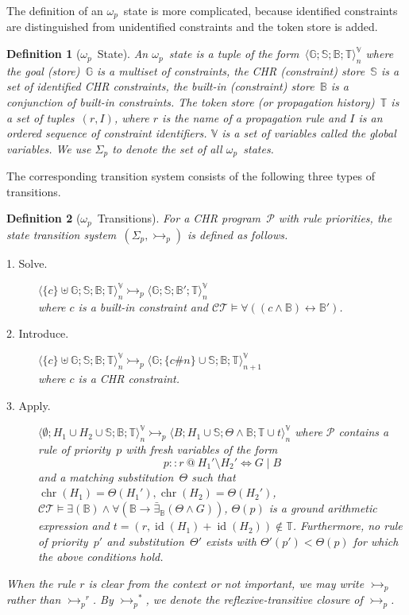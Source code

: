 \documentclass{tlp}
\newtheorem{definition}{Definition}[section]
\newcommand{\B}{\ensuremath{\mathbb{B}}}
\newcommand{\G}{\ensuremath{\mathbb{G}}}
\newcommand{\mcP}{\ensuremath{\mathcal{P}}}
\renewcommand{\S}{\ensuremath{\mathbb{S}}}
\newcommand{\T}{\ensuremath{\mathbb{T}}}
\newcommand{\V}{\ensuremath{\mathbb{V}}}
\newcommand{\CT}{\ensuremath{\mathcal{CT}}}
\DeclareMathOperator{\chr}{chr}
\DeclareMathOperator{\id}{id}
\def\tuple#1{\langle #1 \rangle}
\newcommand{\tstate}[6]{\ensuremath{\tuple{#1; #2; #3; #4}_{#5}^{#6}}}
\newcommand{\pstate}[6]{\ensuremath{\tuple{#1; #2; #3; #4}_{#5}^{#6}}}
\newcommand{\der}{\ensuremath{\rightarrowtail}}
\newcommand{\derp}{\ensuremath{\der_p}}
\begin{document}
The definition of an $\omega_p$~state is more complicated, because
identified constraints are distinguished from unidentified constraints and the
token store is added.

\begin{definition}[$\omega_p$~State] An {\em $\omega_p$~state} is a tuple of the
form~$\pstate{\G}{\S}{\B}{\T}{n}{\V}$ where the {\em goal (store)}~$\G$ is a
multiset of constraints, the {\em CHR (constraint) store}~$\S$ is a set of
identified CHR constraints, the {\em built-in (constraint) store}~$\B$ is a
conjunction of built-in constraints. The {\em token store} (or {\em propagation
history})~$\T$ is a set of tuples~$(r,I)$, where $r$ is the name of a propagation
rule and $I$ is an ordered sequence of constraint identifiers. $\V$ is a set of
variables called the \emph{global variables}. We use $\Sigma_p$ to denote the
set of all $\omega_p$~states.
\end{definition}

The corresponding transition system consists of the following three types of
transitions.

\begin{definition}[$\omega_p$~Transitions]
\label{def:omega-p-transitions}
For a CHR program~$\mcP$ with rule priorities, the state transition
system~$(\Sigma_p,\derp)$ is defined as follows.

\begin{description}
  \item[1. Solve.] $\tstate{\{c\} \uplus \G}{\S}{\B}{\T}{n}{\V} \derp
  \tstate{\G}{\S}{\B'}{\T}{n}{\V}$\\
  where $c$ is a built-in constraint and $\CT \models \forall((c \land \B)
  \leftrightarrow \B')$.
  \item[2. Introduce.] $\tstate{\{c\} \uplus \G}{\S}{\B}{\T}{n}{\V} \derp
  \tstate{\G}{\{c\#n\} \cup \S}{\B}{\T}{n+1}{\V}$\\
  where $c$ is a CHR constraint.
  \item[3. Apply.] $\tstate{\emptyset}{H_1 \cup H_2 \cup \S}{\B}{\T}{n}{\V}
  \derp \tstate{B}{H_1 \cup \S}{\Theta \land \B}{\T \cup t}{n}{\V}$ where $\mcP$
  contains a rule of priority~$p$ with fresh variables of the form \[p :: r\ @\
  H_1' \setminus H_2' \Leftrightarrow G \mid B\] and a matching
  substitution~$\Theta$ such that $\chr(H_1) = \Theta(H_1'), \chr(H_2) =
  \Theta(H_2')$, $\CT \models \exists (\B) \land \forall (\B \rightarrow
  \bar{\exists}_\B(\Theta \land G))$, $\Theta(p)$ is a ground arithmetic
  expression and $t = (r,\id(H_1)+\id(H_2)) \not \in \T$. Furthermore, no rule
  of priority~$p'$ and substitution~$\Theta'$ exists with $\Theta'(p') <
  \Theta(p)$ for which the above conditions hold.
\end{description} 
When the rule $r$ is clear from the context or not important, we may write
$\derp$ rather than $\derp^r$. By $\derp^*$, we denote the reflexive-transitive
closure of $\derp$.
\end{definition}
\end{document}
